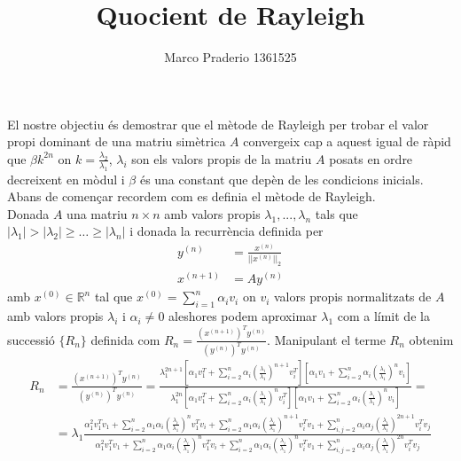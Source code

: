 \documentclass[a4paper,10pt]{article}
\title{Quocient de Rayleigh}
\author{Marco Praderio 1361525}
\date{}
\renewcommand{\*}{\cdot}
\renewcommand{\(}{\left(}
\renewcommand{\)}{\right)}
\newcommand{\R}{\mathbb{R}}
\begin{document}
\maketitle
El nostre objectiu és demostrar que el mètode de Rayleigh per trobar el valor propi dominant de una matriu simètrica $A$ convergeix cap a aquest igual de ràpid que 
$\beta k^{2n}$ on $k=\frac{\lambda_2}{\lambda_1}$, $\lambda_i$ son els valors propis de la matriu $A$ posats en ordre decreixent en mòdul i $\beta$ és una constant
que depèn de les condicions inicials.\\
Abans de començar recordem com es definia el mètode de Rayleigh.\\
Donada $A$ una matriu $n\times n$ amb valors propis $\lambda_1,...,\lambda_n$ tals que $|\lambda_1|>|\lambda_2|\ge\dots\ge|\lambda_n|$ i donada la
recurrència definida per
\begin{equation*}
 \begin{split}
  y^{(n)}&=\frac{x^{(n)}}{||x^{(n)}||_2}\\
  x^{(n+1)}&=Ay^{(n)}
 \end{split}
\end{equation*}
amb $x^{(0)}\in\R^n$ tal que $x^(0)=\sum_{i=1}^n\alpha_iv_i$ on $v_i$ valors propis normalitzats de $A$ amb valors propis $\lambda_i$ i $\alpha_i\not=0$ aleshores podem
aproximar $\lambda_1$ com a límit de la successió
$\{R_n\}$ definida com $R_n=\frac{\(x^{(n+1)}\right)^Ty^{(n)}}{\(y^{(n)}\right)^Ty^{(n)}}$. Manipulant el terme $R_n$ obtenim
\begin{equation*}
 \begin{split}
  R_n&=\frac{\(x^{(n+1)}\)^Ty^{(n)}}{\(y^{(n)}\)^Ty^{(n)}}=\frac{\lambda_1^{2n+1}\left[\alpha_1v_1^T+\sum_{i=2}^n\alpha_i\(\frac{\lambda_i}{\lambda_1}\)^{n+1}v_i^T\right]
  \left[\alpha_1v_1+\sum_{i=2}^n\alpha_i\(\frac{\lambda_i}{\lambda_1}\)^n v_i\right]}{\lambda_1^{2n}\left[\alpha_1v_1^T+\sum_{i=2}^n\alpha_i\(\frac{\lambda_i}{\lambda_1}\)
  ^n v_i^T\right]\left[\alpha_1v_1+\sum_{i=2}^n\alpha_i\(\frac{\lambda_i}{\lambda_1}\)^n v_i\right]}=\\
  &=\lambda_1\frac{\alpha_1^2v_1^Tv_1+\sum_{i=2}^n\alpha_1\alpha_i\(\frac{\lambda_i}{\lambda_1}\)^nv_1^Tv_i+\sum_{i=2}^n\alpha_1\alpha_i\(\frac{\lambda_i}{\lambda_1}\)^{n+1}
  v_i^Tv_1+\sum_{i,j=2}^n\alpha_i\alpha_j\(\frac{\lambda_i}{\lambda_1}\)^{2n+1}v_i^Tv_j}{\alpha_1^2v_1^Tv_1+\sum_{i=2}^n\alpha_1\alpha_i\(\frac{\lambda_i}{\lambda_1}\)^n
  v_1^Tv_i+\sum_{i=2}^n\alpha_1\alpha_i\(\frac{\lambda_i}{\lambda_1}\)^{n}v_i^Tv_1+\sum_{i,j=2}^n\alpha_i\alpha_j\(\frac{\lambda_i}{\lambda_1}\)^{2n}v_i^Tv_j}
 \end{split}
\end{equation*}
\end{document}
